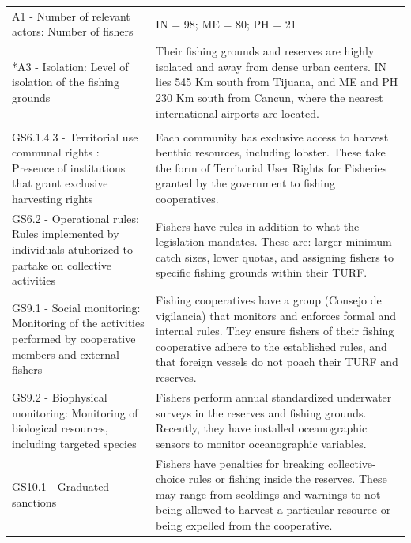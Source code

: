 \documentclass{frontiersSCNS}
\providecommand{\DIFaddendFL}{} %
\begin{document}
\begin{table}[H]
{\begin{tabular}{>{\raggedright\arraybackslash}p{6.5cm}|>{\raggedright\arraybackslash}p{12.2cm}}
\hline
\multicolumn{2}{l}{\textbf{Actors (A)}}\\
\hline
\hspace{1em}A1 - Number of relevant actors: Number of fishers & IN = 98; ME = 80; PH = 21\\
\hline
\hspace{1em}*A3 - Isolation: Level of isolation of the fishing grounds & Their fishing grounds and reserves are highly isolated and away from dense urban centers. IN lies 545 Km south from Tijuana, and ME and PH 230 Km south from Cancun, where the nearest international airports are located.\\
\hline
\multicolumn{2}{l}{\textbf{Governance system (G)}}\\
\hline
\hspace{1em}GS6.1.4.3 - Territorial use communal rights : Presence of institutions that grant exclusive harvesting rights & Each community has exclusive access to harvest benthic resources, including lobster. These take the form of Territorial User Rights for Fisheries granted by the government to fishing cooperatives.\\
\hline
\hspace{1em}GS6.2 - Operational rules: Rules implemented by individuals atuhorized to partake on collective activities & Fishers have rules in addition to what the legislation mandates. These are: larger minimum catch sizes, lower quotas, and assigning fishers to specific fishing grounds within their TURF.\\
\hline
\hspace{1em}GS9.1 - Social monitoring: Monitoring of the activities performed by cooperative members and external fishers & Fishing cooperatives have a group (Consejo de vigilancia) that monitors and enforces formal and internal rules. They ensure fishers of their fishing cooperative adhere to the established rules, and that foreign vessels do not poach their TURF and reserves.\\
\hline
\hspace{1em}GS9.2 - Biophysical monitoring: Monitoring of biological resources, including targeted species & Fishers perform annual standardized underwater surveys in the reserves and fishing grounds. Recently, they have installed oceanographic sensors to monitor oceanographic variables.\\
\hline
GS10.1 - Graduated sanctions & Fishers have penalties for breaking collective-choice rules or fishing inside the reserves. These may range from scoldings and warnings to not being allowed to harvest a particular resource or being expelled from the cooperative.\\
\hline
\end{tabular}}
\DIFaddendFL \end{table}
\end{document}
